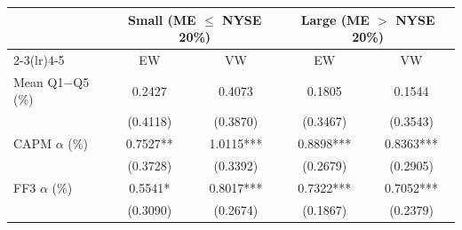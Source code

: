 \begin{tabular}{lcccc}
\toprule
 & \multicolumn{2}{c}{Small (ME $\le$ NYSE 20\%)} & \multicolumn{2}{c}{Large (ME $>$ NYSE 20\%)} \\
\cmidrule(lr){2-3}\cmidrule(lr){4-5}
 & EW & VW & EW & VW \\
\midrule
Mean Q1$-$Q5 (\%) & 0.2427 & 0.4073 & 0.1805 & 0.1544 \\
 & (0.4118) & (0.3870) & (0.3467) & (0.3543) \\
CAPM $\alpha$ (\%) & 0.7527** & 1.0115*** & 0.8898*** & 0.8363*** \\
 & (0.3728) & (0.3392) & (0.2679) & (0.2905) \\
FF3 $\alpha$ (\%) & 0.5541* & 0.8017*** & 0.7322*** & 0.7052*** \\
 & (0.3090) & (0.2674) & (0.1867) & (0.2379) \\
\bottomrule
\end{tabular}
